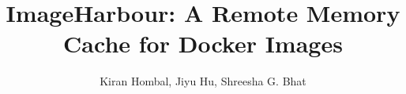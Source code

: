 \documentclass[sigplan,screen,10pt]{acmart}
\begin{document}
\title{ImageHarbour: A Remote Memory Cache for Docker Images}

\author{Kiran Hombal, Jiyu Hu, Shreesha G. Bhat}



\maketitle








\end{document}
